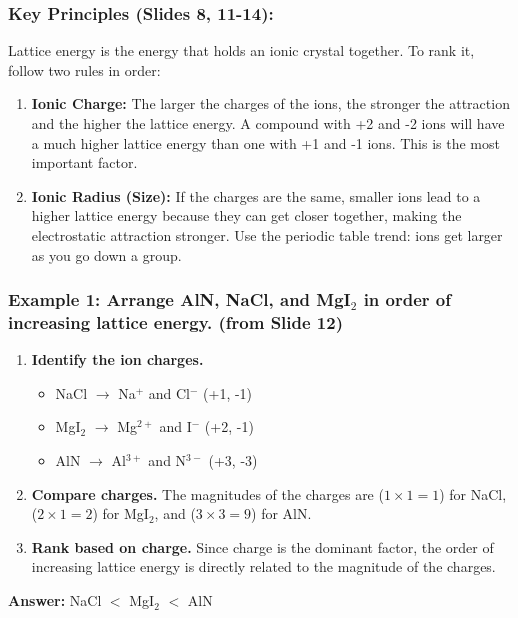 \documentclass{article}
\begin{document}
\subsubsection*{Key Principles (Slides 8, 11-14):}
Lattice energy is the energy that holds an ionic crystal together. To rank it, follow two rules in order:
\begin{enumerate}[itemsep=5pt]
    \item \textbf{Ionic Charge:} The larger the charges of the ions, the stronger the attraction and the higher the lattice energy. A compound with +2 and -2 ions will have a much higher lattice energy than one with +1 and -1 ions. This is the most important factor.
    \item \textbf{Ionic Radius (Size):} If the charges are the same, smaller ions lead to a higher lattice energy because they can get closer together, making the electrostatic attraction stronger. Use the periodic table trend: ions get larger as you go down a group.
\end{enumerate}

\subsubsection*{Example 1: Arrange AlN, NaCl, and MgI$_2$ in order of increasing lattice energy. (from Slide 12)}
\begin{enumerate}[label=Step \arabic*:, itemsep=5pt]
    \item \textbf{Identify the ion charges.}
    \begin{itemize}
        \item NaCl $\rightarrow$ Na$^{+}$ and Cl$^{-}$ (+1, -1)
        \item MgI$_2$ $\rightarrow$ Mg$^{2+}$ and I$^{-}$ (+2, -1)
        \item AlN $\rightarrow$ Al$^{3+}$ and N$^{3-}$ (+3, -3)
    \end{itemize}
    \item \textbf{Compare charges.} The magnitudes of the charges are ($1 \times 1=1$) for NaCl, ($2 \times 1=2$) for MgI$_2$, and ($3 \times 3=9$) for AlN.
    \item \textbf{Rank based on charge.} Since charge is the dominant factor, the order of increasing lattice energy is directly related to the magnitude of the charges.
\end{enumerate}
\textbf{Answer:} NaCl $<$ MgI$_2$ $<$ AlN
\end{document}

